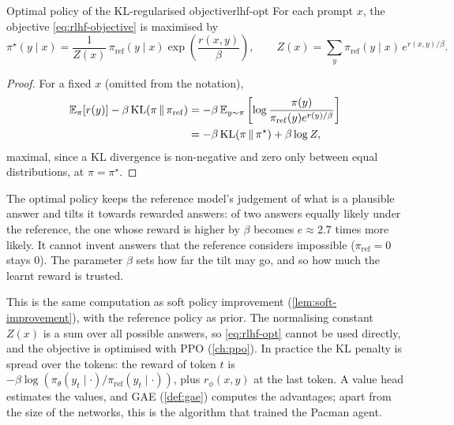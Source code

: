 \begin{proposition}{Optimal policy of the KL-regularised objective}{rlhf-opt}
  For each prompt $x$, the objective \eqref{eq:rlhf-objective} is
  maximised by
  \begin{equation}
    \label{eq:rlhf-opt}
    \pi^\star(y \mid x) = \frac{1}{Z(x)}\, \pi_{\mathrm{ref}}(y \mid x) \exp
    \left( \frac{r(x, y)}{\beta} \right), \qquad Z(x) = \sum_y
    \pi_{\mathrm{ref}}(y \mid x)\, e^{r(x, y)/\beta}.
  \end{equation}
\end{proposition}

\begin{proof}
  For a fixed $x$ (omitted from the notation),
  \begin{align*}
    \mathbb{E}_\pi[r(y)] - \beta\, \mathrm{KL}(\pi \,\|\, \pi_{\mathrm{ref}})
    &= -\beta\, \mathbb{E}_{y \sim \pi}\left[ \log \frac{\pi(y)}{\pi_{\mathrm{ref}}
      (y) e^{r(y)/\beta}} \right] \\
    &= -\beta\, \mathrm{KL}(\pi \,\|\, \pi^\star) + \beta \log Z,
  \end{align*}
  maximal, since a KL divergence is non-negative and zero only between
  equal distributions, at $\pi = \pi^\star$.
\end{proof}

\begin{intuition}
  The optimal policy keeps the reference model's judgement of what is a
  plausible answer and tilts it towards rewarded answers: of two answers
  equally likely under the reference, the one whose reward is higher by
  $\beta$ becomes $e \approx 2.7$ times more likely. It
  cannot invent answers that the reference considers impossible ($\pi_{\mathrm
  {ref}} = 0$ stays $0$). The parameter $\beta$ sets how far the tilt may
  go, and so how much the learnt reward is trusted.
\end{intuition}

This is the same computation as soft policy improvement
(\cref{lem:soft-improvement}), with the reference policy as prior. The
normalising constant $Z(x)$ is a sum over all possible answers, so
\eqref{eq:rlhf-opt} cannot be used directly, and the objective is optimised
with PPO (\cref{ch:ppo}). In practice the KL penalty is spread over the
tokens: the reward of token $t$ is $-\beta \log(\pi_\theta(y_t \mid
\cdot) / \pi_{\mathrm{ref}}(y_t \mid \cdot))$, plus $r_\phi(x, y)$ at the
last token. A value head estimates the values, and GAE (\cref{def:gae})
computes the advantages; apart from the size of the networks, this is the
algorithm that trained the Pacman agent.


